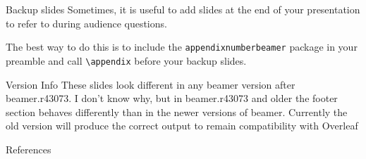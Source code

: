 \documentclass[10pt]{beamer}
\begin{document}
\appendix

\begin{frame}[fragile]{Backup slides}
  Sometimes, it is useful to add slides at the end of your presentation to
  refer to during audience questions.

  The best way to do this is to include the \verb|appendixnumberbeamer|
  package in your preamble and call \verb|\appendix| before your backup slides.
\end{frame}


\begin{frame}[fragile]{Version Info}
  These slides look different in any beamer version after beamer.r43073.
  I don't know why, but in beamer.r43073 and older the footer section behaves differently than in the newer versions of beamer.
  Currently the old version will produce the correct output to remain compatibility with Overleaf
\end{frame}

\begin{frame}[allowframebreaks]{References}
  \printbibliography
\end{frame}
\end{document}
